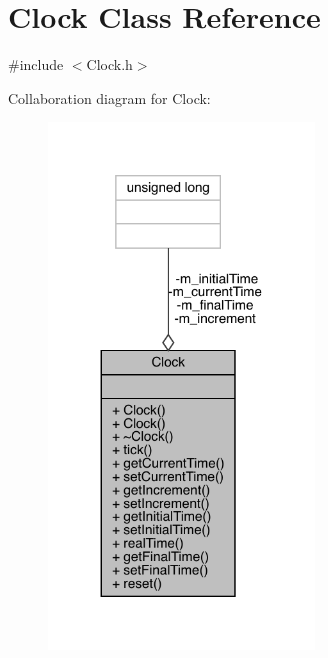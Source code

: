 \hypertarget{class_clock}{}\section{Clock Class Reference}
\label{class_clock}


{\ttfamily \#include $<$Clock.\+h$>$}



Collaboration diagram for Clock\+:
\nopagebreak
\begin{figure}[H]
\begin{center}
\leavevmode
\includegraphics[width=200pt]{class_clock__coll__graph}
\end{center}
\end{figure}
